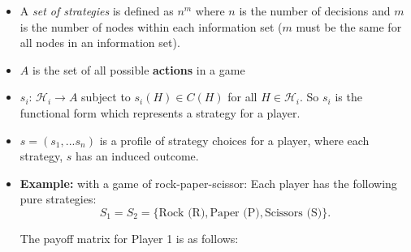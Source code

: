 \documentclass{article}
\begin{document}
\begin{itemize}
\begin{itemize}
        \item A \textit{set of strategies} is defined as $n^m$ where $n$ is the number of decisions and $m$ is the number of nodes within each information set ($m$ must be the same for all nodes in an information set).
        \item $A$ is the set of all possible \textbf{actions }in a game\label{note-act}
        \item $s_i$: $\mathcal{H}_{i} \rightarrow A$ subject to $s_i(H) \in C(H)$ for all $H \in \mathcal{H}_{i}$. So $s_i$ is the functional form which represents a strategy for a player.\label{note-strategy}
        \item $s = (s_1,...s_n)$ is a profile of strategy choices for a player, where each strategy, $s$ has an induced outcome.\label{note-profile}
        \item \textbf{Example:} with a game of rock-paper-scissor: Each player has the following pure strategies:
        \[
        S_1 = S_2 = \{\text{Rock (R)}, \text{Paper (P)}, \text{Scissors (S)}\}.
        \]
        
        The payoff matrix for Player 1 is as follows:
        

\end{itemize}
\end{itemize}
\end{document}
